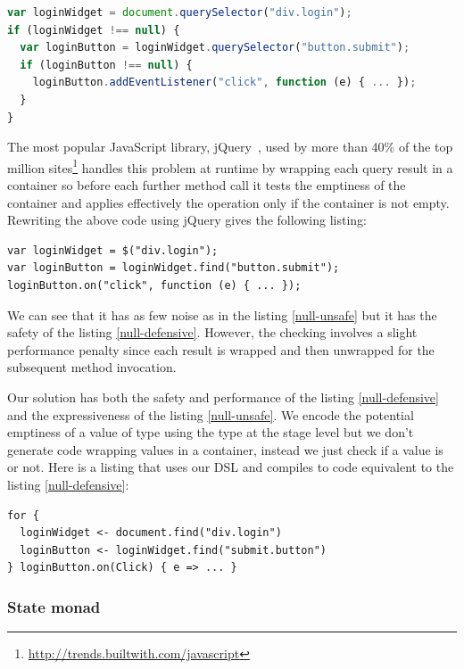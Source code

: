 \documentclass[american,english,runningheads]{llncs}
\begin{document}
\begin{lstlisting}[language=JavaScript,label=null-defensive,caption=Defensive programming to handle null references]
var loginWidget = document.querySelector("div.login");
if (loginWidget !== null) {
  var loginButton = loginWidget.querySelector("button.submit");
  if (loginButton !== null) {
    loginButton.addEventListener("click", function (e) { ... });
  }
}
\end{lstlisting}

The most popular JavaScript library, jQuery~\cite{Bibeault08_jQuery}, used by more than 40\% of the top million sites\footnote{\href{http://trends.builtwith.com/javascript}{http://trends.builtwith.com/javascript}} handles this problem at runtime by wrapping each query result in a container so before each further method call it tests the emptiness of the container and applies effectively the operation only if the container is not empty. Rewriting the above code using jQuery gives the following listing:

\begin{lstlisting}
var loginWidget = $("div.login");
var loginButton = loginWidget.find("button.submit");
loginButton.on("click", function (e) { ... });
\end{lstlisting}

We can see that it has as few noise as in the listing \ref{null-unsafe} but it has the safety of the listing \ref{null-defensive}. However, the checking involves a slight performance penalty since each result is wrapped and then unwrapped for the subsequent method invocation.

Our solution has both the safety and performance of the listing \ref{null-defensive} and the expressiveness of the listing \ref{null-unsafe}. We encode the potential emptiness of a value of type  using the  type at the stage level but we don’t generate code wrapping values in a container, instead we just check if a value is  or not. Here is a listing that uses our DSL and compiles to code equivalent to the listing \ref{null-defensive}:

\begin{lstlisting}
for {
  loginWidget <- document.find("div.login")
  loginButton <- loginWidget.find("submit.button")
} loginButton.on(Click) { e => ... }
\end{lstlisting}

\subsubsection{State monad}
\end{document}
